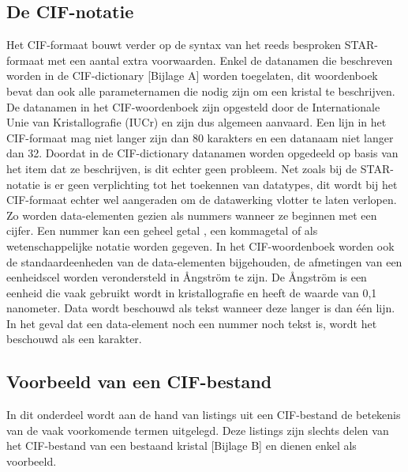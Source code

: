 \subsection{De CIF-notatie}   
Het CIF-formaat bouwt verder op de syntax van het reeds besproken STAR-formaat met een aantal extra voorwaarden. Enkel de datanamen die beschreven worden in de CIF-dictionary [Bijlage A] worden toegelaten, dit woordenboek bevat dan ook alle parameternamen die nodig zijn om een kristal te beschrijven. De datanamen in het CIF-woordenboek zijn opgesteld door de Internationale Unie van Kristallografie (IUCr) en zijn dus algemeen aanvaard. Een lijn in het CIF-formaat mag niet langer zijn dan 80 karakters en een datanaam niet langer dan 32. Doordat in de CIF-dictionary datanamen worden opgedeeld op basis van het item dat ze beschrijven, is dit echter geen probleem. Net zoals bij de STAR-notatie is er geen verplichting tot het toekennen van datatypes, dit wordt bij het CIF-formaat echter wel aangeraden om de datawerking vlotter te laten verlopen. Zo worden data-elementen gezien als nummers wanneer ze beginnen met een cijfer. Een nummer kan een geheel getal , een kommagetal of als wetenschappelijke notatie worden gegeven. In het CIF-woordenboek worden ook de standaardeenheden van de data-elementen bijgehouden, de afmetingen van een eenheidscel worden verondersteld in Ångström te zijn. De Ångström is een eenheid die vaak gebruikt wordt in kristallografie en heeft de waarde van 0,1 nanometer. Data wordt beschouwd als tekst wanneer deze langer is dan één lijn. In het geval dat een data-element noch een nummer noch tekst is, wordt het beschouwd als een karakter. 

\subsection{Voorbeeld van een CIF-bestand}

In dit onderdeel wordt aan de hand van listings uit een CIF-bestand de betekenis van de vaak voorkomende termen uitgelegd. Deze listings zijn slechts delen van het CIF-bestand van een bestaand kristal [Bijlage B] en dienen enkel als voorbeeld.



